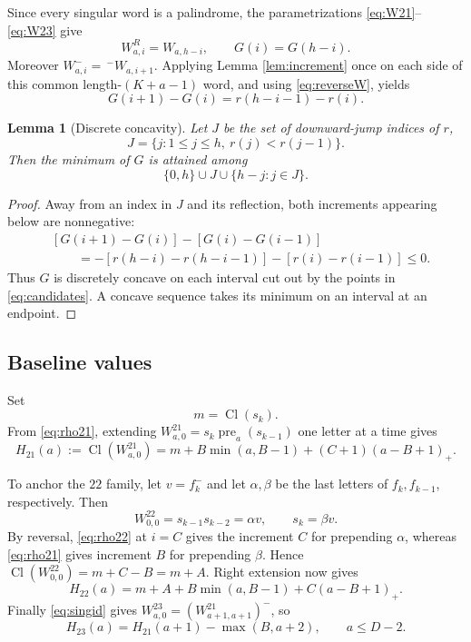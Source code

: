 \documentclass[11pt]{amsart}
\newtheorem{lemma}[theorem]{Lemma}
\newcommand{\Cl}{\operatorname{Cl}}
\newcommand{\pre}{\operatorname{pre}}
\newcommand{\pospart}[1]{(#1)_{+}}
\begin{document}
Since every singular word is a palindrome, the parametrizations \eqref{eq:W21}--\eqref{eq:W23} give
\begin{equation}\label{eq:reverseW}
 W_{a,i}^{R}=W_{a,h-i},\qquad G(i)=G(h-i).
\end{equation}
Moreover $W_{a,i}^-=\,{}^-W_{a,i+1}$.  Applying Lemma \ref{lem:increment} once on each side of this common length-$(K+a-1)$ word, and using \eqref{eq:reverseW}, yields
\begin{equation}\label{eq:diffG}
 \boxed{\;G(i+1)-G(i)=r(h-i-1)-r(i).\;}
\end{equation}

\begin{lemma}[Discrete concavity]\label{lem:concavity}
Let $J$ be the set of downward-jump indices of $r$,
\[
 J=\{j:1\le j\le h,\ r(j)<r(j-1)\}.
\]
Then the minimum of $G$ is attained among
\begin{equation}\label{eq:candidates}
 \{0,h\}\cup J\cup\{h-j:j\in J\}.
\end{equation}
\end{lemma}

\begin{proof}
Away from an index in $J$ and its reflection, both increments appearing below are nonnegative:
\begin{align*}
 &[G(i+1)-G(i)]-[G(i)-G(i-1)]\\
 &\qquad=-[r(h-i)-r(h-i-1)]-[r(i)-r(i-1)]\le0.
\end{align*}
Thus $G$ is discretely concave on each interval cut out by the points in \eqref{eq:candidates}.  A concave sequence takes its minimum on an interval at an endpoint.
\end{proof}

\subsection{Baseline values}
Set
\[
 m=\Cl(s_k).
\]
From \eqref{eq:rho21}, extending $W^{21}_{a,0}=s_k\pre_a(s_{k-1})$ one letter at a time gives
\begin{equation}\label{eq:H21}
 H_{21}(a):=\Cl(W^{21}_{a,0})
 =m+B\min(a,B-1)+(C+1)\pospart{a-B+1}.
\end{equation}

To anchor the $22$ family, let $v=f_k^-$ and let $\alpha,\beta$ be the
last letters of $f_k,f_{k-1}$, respectively.  Then
\[
 W^{22}_{0,0}=s_{k-1}s_{k-2}=\alpha v,
 \qquad s_k=\beta v.
\]
By reversal, \eqref{eq:rho22} at $i=C$ gives the increment $C$ for
prepending $\alpha$, whereas \eqref{eq:rho21} gives increment $B$ for
prepending $\beta$.  Hence $\Cl(W^{22}_{0,0})=m+C-B=m+A$.
Right extension now gives
\begin{equation}\label{eq:H22}
 H_{22}(a)=m+A+B\min(a,B-1)+C\pospart{a-B+1}.
\end{equation}
Finally \eqref{eq:singid} gives
$W^{23}_{a,0}=(W^{21}_{a+1,a+1})^-$, so
\begin{equation}\label{eq:H23rel}
 H_{23}(a)=H_{21}(a+1)-\max(B,a+2),\qquad a\le D-2.
\end{equation}
\end{document}
